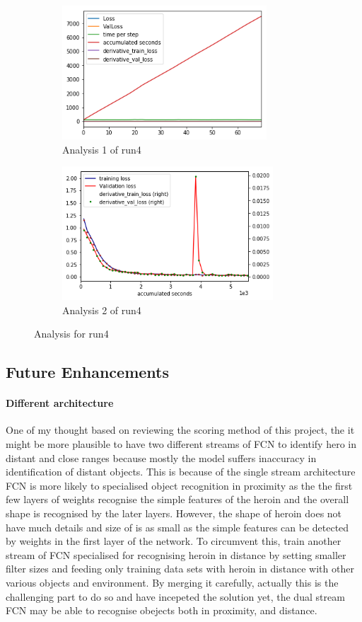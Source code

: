 \documentclass[paper=a4, fontsize=11pt]{scrartcl} %
\numberwithin{equation}{section} %
\numberwithin{figure}{section} %
\numberwithin{table}{section} %
\begin{document}
\begin{figure}	
	\begin{subfigure}{0.45\textwidth}
	\includegraphics[width=0.9\linewidth, height=5cm]{./imgs/analysis_0_4.png} 
	\caption{Analysis 1 of run4}
	\label{fig:subAnalysisRun4}
	\end{subfigure}
	\begin{subfigure}{0.45\textwidth}
	\includegraphics[width=0.9\linewidth, height=5cm]{./imgs/analysis_4plot.png}
	\caption{Analysis 2 of run4}
	\label{fig:subAnalysisRun4plot}
	\end{subfigure}
	 
	\caption{Analysis for run4}
	\label{fig:AnalysisRun4}
 \end{figure}

\subsection{Future Enhancements}

\paragraph{Different architecture}
One of my thought based on reviewing the scoring method of this project, the it might be more plausible to have two different streams of FCN to identify hero in distant and close ranges because mostly the model suffers inaccuracy in identification of distant objects. This is because of the single stream architecture FCN is more likely to specialised object recognition in proximity as the the first few layers of weights recognise the simple features of the heroin and the overall shape is recognised by the later layers. However, the shape of heroin does not have much details and size of is as small as the simple features can be detected by weights in the first layer of the network. To circumvent this, train another stream of FCN specialised for recognising heroin in distance by setting smaller filter sizes and feeding only training data sets with heroin in distance with other various objects and environment. By merging it carefully, actually this is the challenging part to do so and have incepeted the solution yet, the dual stream FCN may be able to recognise obejects both in proximity, and distance.
\end{document}
